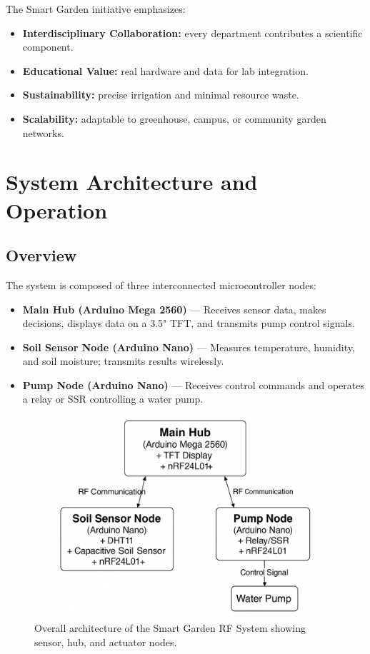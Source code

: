 \documentclass[12pt,a4paper]{article}
\begin{document}
The Smart Garden initiative emphasizes:
\begin{itemize}
  \item \textbf{Interdisciplinary Collaboration:} every department contributes a scientific component.
  \item \textbf{Educational Value:} real hardware and data for lab integration.
  \item \textbf{Sustainability:} precise irrigation and minimal resource waste.
  \item \textbf{Scalability:} adaptable to greenhouse, campus, or community garden networks.
\end{itemize}

\clearpage
\section{System Architecture and Operation}

\subsection{Overview}
The system is composed of three interconnected microcontroller nodes:
\begin{itemize}
  \item \textbf{Main Hub (Arduino Mega 2560)} — Receives sensor data, makes decisions, displays data on a 3.5" TFT, and transmits pump control signals.
  \item \textbf{Soil Sensor Node (Arduino Nano)} — Measures temperature, humidity, and soil moisture; transmits results wirelessly.
  \item \textbf{Pump Node (Arduino Nano)} — Receives control commands and operates a relay or SSR controlling a water pump.
\end{itemize}

\begin{figure}[H]\centering
\includegraphics[width=0.9\linewidth]{architecture_placeholder.png}
\caption{Overall architecture of the Smart Garden RF System showing sensor, hub, and actuator nodes.}
\end{figure}
\end{document}

